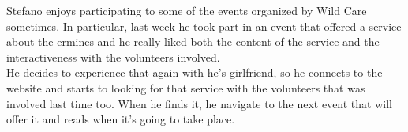 Stefano enjoys participating to some of the events organized by Wild Care sometimes. In particular, last week he took part in an event that offered a service about the ermines and he really liked both the content of the service and the interactiveness with the volunteers involved.\\
He decides to experience that again with he's girlfriend, so he connects to the website and starts to looking for that service with the volunteers that was involved last time too. When he finds it, he navigate to the next event that will offer it and reads when it's going to take place.